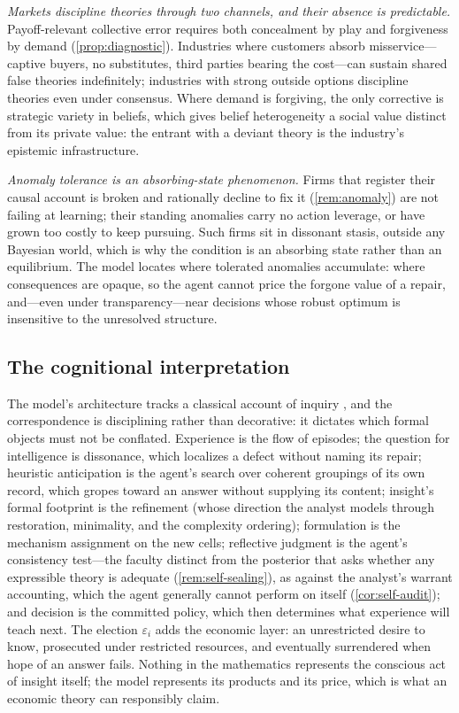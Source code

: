 \documentclass[11pt]{article}
\theoremstyle{definition}
\begin{document}
\emph{Markets discipline theories through two channels, and their absence
is predictable.}  Payoff-relevant collective error requires both concealment
by play and forgiveness by demand (\cref{prop:diagnostic}).  Industries
where customers absorb misservice---captive buyers, no substitutes, third
parties bearing the cost---can sustain shared false theories indefinitely;
industries with strong outside options discipline theories even under
consensus.  Where demand is forgiving, the only corrective is strategic
variety in beliefs, which gives belief heterogeneity a social value distinct
from its private value: the entrant with a deviant theory is the industry's
epistemic infrastructure.

\emph{Anomaly tolerance is an absorbing-state phenomenon.}  Firms that
register their causal account is broken and rationally decline to fix it
(\cref{rem:anomaly}) are not failing at learning; their standing anomalies
carry no action leverage, or have grown too costly to keep pursuing.  Such
firms sit in dissonant stasis, outside any Bayesian world, which is why the
condition is an absorbing state rather than an equilibrium.  The model locates
where tolerated anomalies accumulate: where consequences are opaque, so the
agent cannot price the forgone value of a repair, and---even under
transparency---near decisions whose robust optimum is insensitive to the
unresolved structure.

\subsection{The cognitional interpretation}

The model's architecture tracks a classical account of inquiry
\citep{Lonergan1992,RyallWilkins2018}, and the correspondence is
disciplining rather than decorative: it dictates which formal objects must
not be conflated.  Experience is the flow of episodes; the question for
intelligence is dissonance, which localizes a defect without naming its
repair; heuristic anticipation is the agent's search over coherent groupings
of its own record, which gropes toward an answer without supplying its
content; insight's formal footprint is the refinement (whose direction the
analyst models through restoration, minimality, and the complexity ordering);
formulation is the mechanism assignment on the new cells; reflective judgment
is the agent's consistency test---the faculty distinct from the posterior
that asks whether any expressible theory is adequate (\cref{rem:self-sealing}),
as against the analyst's warrant accounting, which the agent generally cannot
perform on itself (\cref{cor:self-audit}); and decision is the committed
policy, which then determines what experience will teach next.  The election
$\varepsilon_i$ adds the economic layer: an unrestricted desire to know,
prosecuted under restricted resources, and eventually surrendered when hope of
an answer fails.  Nothing in the mathematics represents the conscious act of
insight itself; the model represents its products and its price, which is what
an economic theory can responsibly claim.
\end{document}
